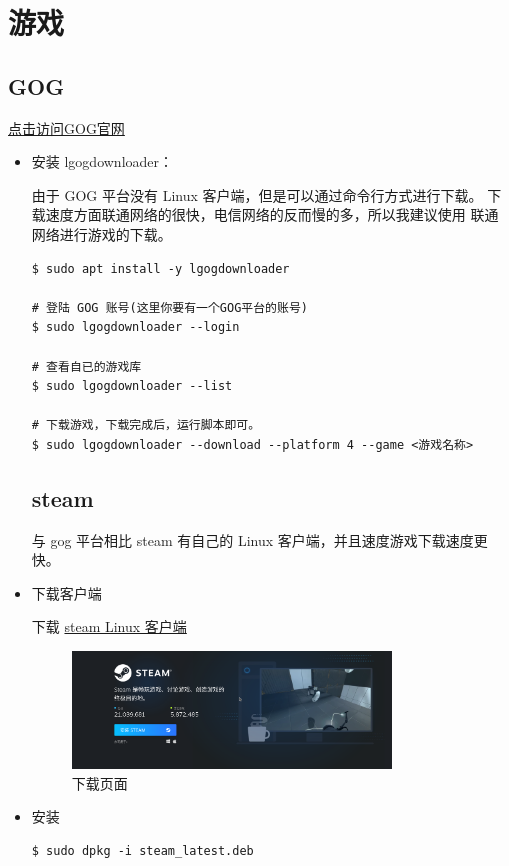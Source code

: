 \chapter{游戏}

\section{GOG} 

\href{https://www.gog.com/}{点击访问GOG官网}
\begin{itemize} 
\item 安装 lgogdownloader：

由于 GOG 平台没有 Linux 客户端，但是可以通过命令行方式进行下载。
下载速度方面联通网络的很快，电信网络的反而慢的多，所以我建议使用
联通网络进行游戏的下载。

\begin{lstlisting}
$ sudo apt install -y lgogdownloader

# 登陆 GOG 账号(这里你要有一个GOG平台的账号)
$ sudo lgogdownloader --login 

# 查看自已的游戏库
$ sudo lgogdownloader --list

# 下载游戏，下载完成后，运行脚本即可。
$ sudo lgogdownloader --download --platform 4 --game <游戏名称>
\end{lstlisting}
\newpage

\section{steam}

与 gog 平台相比 steam 有自己的 Linux 客户端，并且速度游戏下载速度更快。

\item 下载客户端

下载 \href{https://store.steampowered.com/about/}{steam Linux 客户端} 

\begin{figure}[hbt!]  
	\centering
	\includegraphics[width=0.8\textwidth]{./img/game/steam.png}
	\caption{下载页面} %
	\label{fig:steam} %
\end{figure}

\item 安装
\begin{lstlisting}
$ sudo dpkg -i steam_latest.deb
\end{lstlisting}

\end{itemize}
